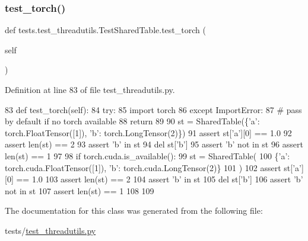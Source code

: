 \subsubsection{\texorpdfstring{test\+\_\+torch()}{test\_torch()}}
{\footnotesize\ttfamily def tests.\+test\+\_\+threadutils.\+Test\+Shared\+Table.\+test\+\_\+torch (\begin{DoxyParamCaption}\item[{}]{self }\end{DoxyParamCaption})}



Definition at line 83 of file test\+\_\+threadutils.\+py.


\begin{DoxyCode}
83     \textcolor{keyword}{def }test\_torch(self):
84         \textcolor{keywordflow}{try}:
85             \textcolor{keyword}{import} torch
86         \textcolor{keywordflow}{except} ImportError:
87             \textcolor{comment}{# pass by default if no torch available}
88             \textcolor{keywordflow}{return}
89 
90         st = SharedTable(\{\textcolor{stringliteral}{'a'}: torch.FloatTensor([1]), \textcolor{stringliteral}{'b'}: torch.LongTensor(2)\})
91         \textcolor{keyword}{assert} st[\textcolor{stringliteral}{'a'}][0] == 1.0
92         \textcolor{keyword}{assert} len(st) == 2
93         \textcolor{keyword}{assert} \textcolor{stringliteral}{'b'} \textcolor{keywordflow}{in} st
94         del st[\textcolor{stringliteral}{'b'}]
95         \textcolor{keyword}{assert} \textcolor{stringliteral}{'b'} \textcolor{keywordflow}{not} \textcolor{keywordflow}{in} st
96         \textcolor{keyword}{assert} len(st) == 1
97 
98         \textcolor{keywordflow}{if} torch.cuda.is\_available():
99             st = SharedTable(
100                 \{\textcolor{stringliteral}{'a'}: torch.cuda.FloatTensor([1]), \textcolor{stringliteral}{'b'}: torch.cuda.LongTensor(2)\}
101             )
102             \textcolor{keyword}{assert} st[\textcolor{stringliteral}{'a'}][0] == 1.0
103             \textcolor{keyword}{assert} len(st) == 2
104             \textcolor{keyword}{assert} \textcolor{stringliteral}{'b'} \textcolor{keywordflow}{in} st
105             del st[\textcolor{stringliteral}{'b'}]
106             \textcolor{keyword}{assert} \textcolor{stringliteral}{'b'} \textcolor{keywordflow}{not} \textcolor{keywordflow}{in} st
107             \textcolor{keyword}{assert} len(st) == 1
108 
109 
\end{DoxyCode}


The documentation for this class was generated from the following file\+:\begin{DoxyCompactItemize}
\item 
tests/\hyperlink{test__threadutils_8py}{test\+\_\+threadutils.\+py}\end{DoxyCompactItemize}
